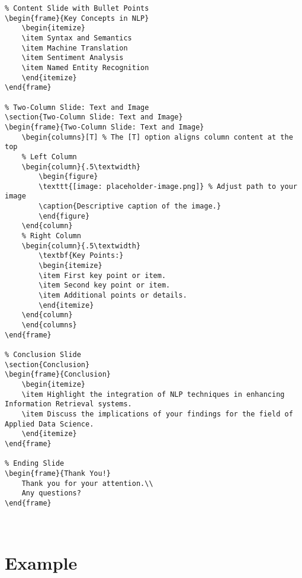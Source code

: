 \begin{verbatim}
% Content Slide with Bullet Points
\begin{frame}{Key Concepts in NLP}
    \begin{itemize}
    \item Syntax and Semantics
    \item Machine Translation
    \item Sentiment Analysis
    \item Named Entity Recognition
    \end{itemize}
\end{frame}

% Two-Column Slide: Text and Image
\section{Two-Column Slide: Text and Image}
\begin{frame}{Two-Column Slide: Text and Image}
    \begin{columns}[T] % The [T] option aligns column content at the top
    % Left Column
    \begin{column}{.5\textwidth}
        \begin{figure}
        \texttt{[image: placeholder-image.png]} % Adjust path to your image
        \caption{Descriptive caption of the image.}
        \end{figure}
    \end{column}
    % Right Column
    \begin{column}{.5\textwidth}
        \textbf{Key Points:}
        \begin{itemize}
        \item First key point or item.
        \item Second key point or item.
        \item Additional points or details.
        \end{itemize}
    \end{column}
    \end{columns}
\end{frame}

% Conclusion Slide
\section{Conclusion}
\begin{frame}{Conclusion}
    \begin{itemize}
    \item Highlight the integration of NLP techniques in enhancing Information Retrieval systems.
    \item Discuss the implications of your findings for the field of Applied Data Science.
    \end{itemize}
\end{frame}

% Ending Slide
\begin{frame}{Thank You!}
    Thank you for your attention.\\
    Any questions?
\end{frame}

        
\end{verbatim}

\section{Example}

